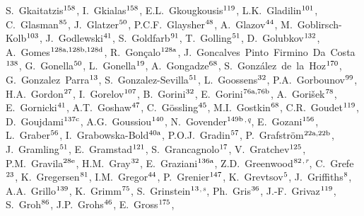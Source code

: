 \begin{flushleft}
S.~Gkaitatzis$^\textrm{\scriptsize 158}$,
I.~Gkialas$^\textrm{\scriptsize 158}$,
E.L.~Gkougkousis$^\textrm{\scriptsize 119}$,
L.K.~Gladilin$^\textrm{\scriptsize 101}$,
C.~Glasman$^\textrm{\scriptsize 85}$,
J.~Glatzer$^\textrm{\scriptsize 50}$,
P.C.F.~Glaysher$^\textrm{\scriptsize 48}$,
A.~Glazov$^\textrm{\scriptsize 44}$,
M.~Goblirsch-Kolb$^\textrm{\scriptsize 103}$,
J.~Godlewski$^\textrm{\scriptsize 41}$,
S.~Goldfarb$^\textrm{\scriptsize 91}$,
T.~Golling$^\textrm{\scriptsize 51}$,
D.~Golubkov$^\textrm{\scriptsize 132}$,
A.~Gomes$^\textrm{\scriptsize 128a,128b,128d}$,
R.~Gon\c{c}alo$^\textrm{\scriptsize 128a}$,
J.~Goncalves~Pinto~Firmino~Da~Costa$^\textrm{\scriptsize 138}$,
G.~Gonella$^\textrm{\scriptsize 50}$,
L.~Gonella$^\textrm{\scriptsize 19}$,
A.~Gongadze$^\textrm{\scriptsize 68}$,
S.~Gonz\'alez~de~la~Hoz$^\textrm{\scriptsize 170}$,
G.~Gonzalez~Parra$^\textrm{\scriptsize 13}$,
S.~Gonzalez-Sevilla$^\textrm{\scriptsize 51}$,
L.~Goossens$^\textrm{\scriptsize 32}$,
P.A.~Gorbounov$^\textrm{\scriptsize 99}$,
H.A.~Gordon$^\textrm{\scriptsize 27}$,
I.~Gorelov$^\textrm{\scriptsize 107}$,
B.~Gorini$^\textrm{\scriptsize 32}$,
E.~Gorini$^\textrm{\scriptsize 76a,76b}$,
A.~Gori\v{s}ek$^\textrm{\scriptsize 78}$,
E.~Gornicki$^\textrm{\scriptsize 41}$,
A.T.~Goshaw$^\textrm{\scriptsize 47}$,
C.~G\"ossling$^\textrm{\scriptsize 45}$,
M.I.~Gostkin$^\textrm{\scriptsize 68}$,
C.R.~Goudet$^\textrm{\scriptsize 119}$,
D.~Goujdami$^\textrm{\scriptsize 137c}$,
A.G.~Goussiou$^\textrm{\scriptsize 140}$,
N.~Govender$^\textrm{\scriptsize 149b}$$^{,q}$,
E.~Gozani$^\textrm{\scriptsize 156}$,
L.~Graber$^\textrm{\scriptsize 56}$,
I.~Grabowska-Bold$^\textrm{\scriptsize 40a}$,
P.O.J.~Gradin$^\textrm{\scriptsize 57}$,
P.~Grafstr\"om$^\textrm{\scriptsize 22a,22b}$,
J.~Gramling$^\textrm{\scriptsize 51}$,
E.~Gramstad$^\textrm{\scriptsize 121}$,
S.~Grancagnolo$^\textrm{\scriptsize 17}$,
V.~Gratchev$^\textrm{\scriptsize 125}$,
P.M.~Gravila$^\textrm{\scriptsize 28e}$,
H.M.~Gray$^\textrm{\scriptsize 32}$,
E.~Graziani$^\textrm{\scriptsize 136a}$,
Z.D.~Greenwood$^\textrm{\scriptsize 82}$$^{,r}$,
C.~Grefe$^\textrm{\scriptsize 23}$,
K.~Gregersen$^\textrm{\scriptsize 81}$,
I.M.~Gregor$^\textrm{\scriptsize 44}$,
P.~Grenier$^\textrm{\scriptsize 147}$,
K.~Grevtsov$^\textrm{\scriptsize 5}$,
J.~Griffiths$^\textrm{\scriptsize 8}$,
A.A.~Grillo$^\textrm{\scriptsize 139}$,
K.~Grimm$^\textrm{\scriptsize 75}$,
S.~Grinstein$^\textrm{\scriptsize 13}$$^{,s}$,
Ph.~Gris$^\textrm{\scriptsize 36}$,
J.-F.~Grivaz$^\textrm{\scriptsize 119}$,
S.~Groh$^\textrm{\scriptsize 86}$,
J.P.~Grohs$^\textrm{\scriptsize 46}$,
E.~Gross$^\textrm{\scriptsize 175}$,
$$
\end{flushleft}
